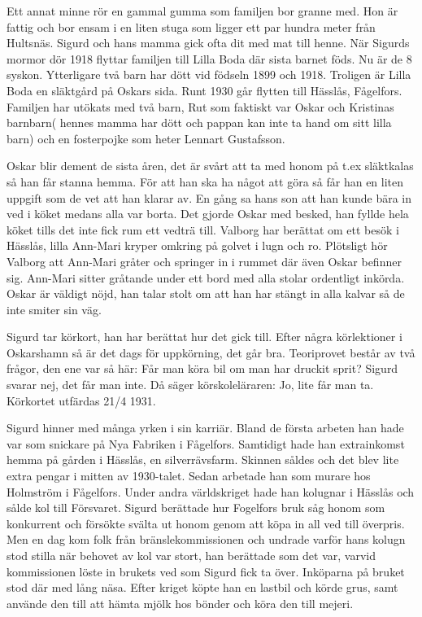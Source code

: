 Ett annat minne rör en gammal gumma som familjen bor granne med. Hon är fattig och bor ensam i en liten stuga som ligger ett par hundra meter från Hultsnäs. Sigurd och hans mamma gick ofta dit med mat till henne.
När Sigurds mormor dör 1918 flyttar familjen till Lilla Boda där sista barnet föds. Nu är de 8 syskon. Ytterligare två barn har dött vid födseln 1899 och 1918.
Troligen är Lilla Boda en släktgård på Oskars sida.
Runt 1930 går flytten till Hässlås, Fågelfors. Familjen har utökats med två barn, Rut som faktiskt var Oskar och Kristinas barnbarn( hennes mamma har dött och pappan kan inte ta hand om sitt lilla barn) och en fosterpojke som heter Lennart Gustafsson.


Oskar blir dement de sista åren, det är svårt att ta med honom på t.ex släktkalas så han får stanna hemma. För att han ska ha något att göra så får han en liten uppgift som de vet att han klarar av. En gång sa hans son att han kunde bära in ved i köket medans alla var borta. Det gjorde Oskar med besked, han fyllde hela köket tills det inte fick rum ett vedträ till.
Valborg har berättat om ett besök i Hässlås, lilla Ann-Mari  kryper omkring på golvet i lugn och ro. Plötsligt hör Valborg att Ann-Mari gråter och springer in i rummet där även Oskar befinner sig. Ann-Mari sitter gråtande under ett bord med alla stolar ordentligt inkörda. Oskar är väldigt nöjd, han talar stolt om att han har stängt in alla kalvar så de inte smiter sin väg.








Sigurd tar körkort, han har berättat hur det gick till. Efter några körlektioner i Oskarshamn så är det dags för uppkörning, det går bra. Teoriprovet består av två frågor, den ene var så här: Får man köra bil om man har druckit sprit? Sigurd svarar nej, det får man inte. Då säger körskoleläraren: Jo, lite får man ta. Körkortet utfärdas 21/4 1931.


Sigurd hinner med många yrken i sin karriär. Bland de första arbeten han hade var som snickare på Nya Fabriken i Fågelfors. Samtidigt hade han extrainkomst hemma på gården i Hässlås, en silverrävsfarm. Skinnen såldes och det blev lite extra pengar i mitten av 1930-talet. Sedan arbetade han som murare hos Holmström i Fågelfors. Under andra världskriget hade han kolugnar i Hässlås och sålde kol till Försvaret. Sigurd berättade hur Fogelfors bruk såg honom som konkurrent och försökte svälta ut honom genom att köpa in all ved till överpris. Men en dag kom folk från bränslekommissionen och undrade varför hans kolugn stod stilla när behovet av kol var stort, han berättade som det var, varvid kommissionen löste in brukets ved som Sigurd fick ta över. Inköparna på bruket stod där med lång näsa. Efter kriget köpte han en lastbil och körde grus, samt använde den till att hämta mjölk hos bönder och köra den till mejeri.


